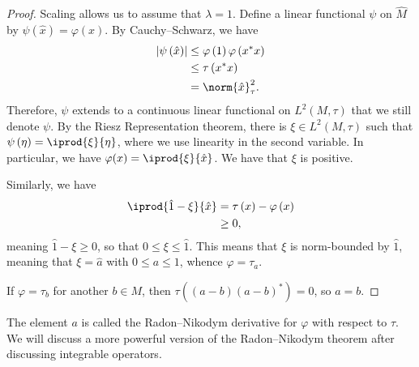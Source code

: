 \documentclass[10pt]{mypackage}
\begin{document}
\begin{proof}
  Scaling allows us to assume that $\lambda = 1$. Define a linear functional $\psi$ on $ \widehat{M} $ by $\psi\left( \hat{x} \right) = \varphi(x)$. By Cauchy--Schwarz, we have
  \begin{align*}
    \left\vert \psi\left( \hat{x} \right) \right\vert &\leq \varphi\left( 1 \right)\varphi\left( x^{\ast}x \right)\\
                                                      &\leq \tau\left( x^{\ast}x \right)\\
                                                      &= \norm{\hat{x}}_{\tau}^2.
  \end{align*}
  Therefore, $\psi$ extends to a continuous linear functional on $L^2\left( M,\tau \right)$ that we still denote $\psi$. By the Riesz Representation theorem, there is $\xi\in L^2\left( M,\tau \right)$ such that $\psi\left( \eta \right) = \iprod{\xi}{\eta}$, where we use linearity in the second variable. In particular, we have $\varphi(x) = \iprod{\xi}{\hat{x}}$. We have that $\xi$ is positive.

  Similarly, we have
  \begin{align*}
    \iprod{\hat{1}-\xi}{\hat{x}} &= \tau\left( x \right)-\varphi\left( x \right)\\
                                 &\geq 0,
  \end{align*}
  meaning $\hat{1}-\xi \geq 0$, so that $0\leq \xi\leq \hat{1}$. This means that $\xi$ is norm-bounded by $\hat{1}$, meaning that $\xi = \hat{a}$ with $0\leq a \leq 1$, whence $\varphi = \tau_a$.

  If $\varphi = \tau_b$ for another $b\in M$, then $\tau\left( \left( a-b \right)\left( a-b \right)^{\ast} \right) = 0$, so $a = b$.
\end{proof}
The element $a$ is called the Radon--Nikodym derivative for $\varphi$ with respect to $\tau$. We will discuss a more powerful version of the Radon--Nikodym theorem after discussing integrable operators.
\end{document}
